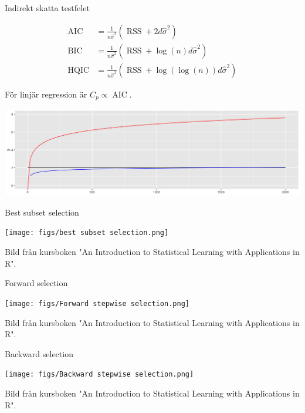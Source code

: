 \documentclass[10pt,english]{beamer}
\newenvironment{nscenter}
 {\parskip=0pt\par\nopagebreak\centering}
 {\par\noindent\ignorespacesafterend}
\begin{document}
\begin{frame}{Indirekt skatta testfelet}
    

    \begin{align*}
        \operatorname{AIC} &= \frac{1}{n \hat{\sigma}^2} (\operatorname{RSS} + 2 d \hat{\sigma}^2) \\
        \operatorname{BIC} &= \frac{1}{n \hat{\sigma}^2} (\operatorname{RSS} + \log(n) d \hat{\sigma}^2) \\
        \operatorname{HQIC} &= \frac{1}{n \hat{\sigma}^2} (\operatorname{RSS} + \log(\log(n)) d \hat{\sigma}^2)
    \end{align*}

    För linjär regression är $C_p \propto \operatorname{AIC}$.

    \includegraphics[width = \textwidth]{figs/logplot.png}

\end{frame}

\begin{frame}{Best subset selection}
    \begin{nscenter}
        \texttt{[image: figs/best subset selection.png]}
    \end{nscenter}
    Bild från kursboken "An Introduction to Statistical Learning with Applications in R".

\end{frame}

\begin{frame}{Forward selection}
    \begin{nscenter}
        \texttt{[image: figs/Forward stepwise selection.png]}
    \end{nscenter}
    Bild från kursboken "An Introduction to Statistical Learning with Applications in R".

\end{frame}

\begin{frame}{Backward selection}
    \begin{nscenter}
        \texttt{[image: figs/Backward stepwise selection.png]}
    \end{nscenter}
    Bild från kursboken "An Introduction to Statistical Learning with Applications in R".

\end{frame}
\end{document}
